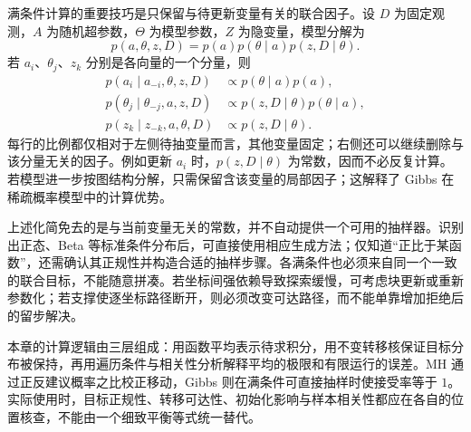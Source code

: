 满条件计算的重要技巧是只保留与待更新变量有关的联合因子。设 $D$ 为固定观测，$A$ 为随机超参数，$\Theta$ 为模型参数，$Z$ 为隐变量，模型分解为
\begin{equation}
p(a,\theta,z,D)=p(a)p(\theta\mid a)p(z,D\mid\theta).
\label{eq:lh-mcmc-hierarchical-model}
\end{equation}
若 $a_i$、$\theta_j$、$z_k$ 分别是各向量的一个分量，则
\begin{equation}
\begin{aligned}
p(a_i\mid a_{-i},\theta,z,D)
&\propto p(\theta\mid a)p(a),\\
p(\theta_j\mid\theta_{-j},a,z,D)
&\propto p(z,D\mid\theta)p(\theta\mid a),\\
p(z_k\mid z_{-k},a,\theta,D)
&\propto p(z,D\mid\theta).
\end{aligned}
\label{eq:lh-mcmc-hierarchical-conditionals}
\end{equation}
每行的比例都仅相对于左侧待抽变量而言，其他变量固定；右侧还可以继续删除与该分量无关的因子。例如更新 $a_i$ 时，$p(z,D\mid\theta)$ 为常数，因而不必反复计算。若模型进一步按图结构分解，只需保留含该变量的局部因子；这解释了 Gibbs 在稀疏概率模型中的计算优势。

上述化简免去的是与当前变量无关的常数，并不自动提供一个可用的抽样器。识别出正态、Beta 等标准条件分布后，可直接使用相应生成方法；仅知道“正比于某函数”，还需确认其正规性并构造合适的抽样步骤。各满条件也必须来自同一个一致的联合目标，不能随意拼凑。若坐标间强依赖导致探索缓慢，可考虑块更新或重新参数化；若支撑使逐坐标路径断开，则必须改变可达路径，而不能单靠增加拒绝后的留步解决。

本章的计算逻辑由三层组成：用函数平均表示待求积分，用不变转移核保证目标分布被保持，再用遍历条件与相关性分析解释平均的极限和有限运行的误差。MH 通过正反建议概率之比校正移动，Gibbs 则在满条件可直接抽样时使接受率等于 $1$。实际使用时，目标正规性、转移可达性、初始化影响与样本相关性都应在各自的位置核查，不能由一个细致平衡等式统一替代。





